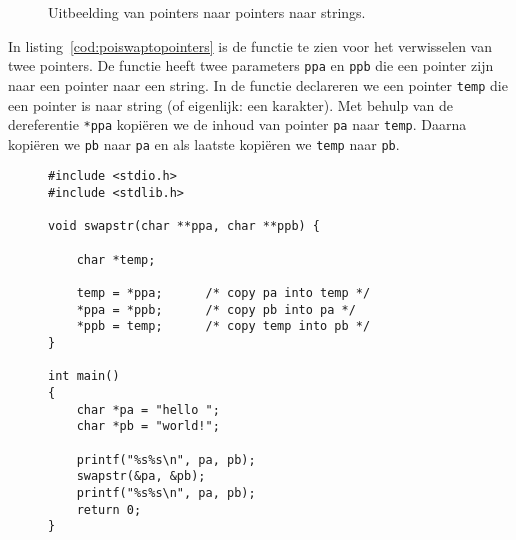 \begin{figure}[!ht]
\centering
{}
\caption{Uitbeelding van pointers naar pointers naar strings.}
\label{fig:poipointertopointerstring}
\end{figure}

In listing~\ref{cod:poiswaptopointers} is de functie te zien voor het verwisselen van twee pointers. De functie heeft twee parameters \texttt{ppa} en \texttt{ppb} die een pointer zijn naar een pointer naar een string. In de functie declareren we een pointer \texttt{temp} die een pointer is naar string (of eigenlijk: een karakter). Met behulp van de dereferentie \texttt{*ppa} kopiëren we de inhoud van pointer \texttt{pa} naar \texttt{temp}. Daarna kopiëren we \texttt{pb} naar \texttt{pa} en als laatste kopiëren we \texttt{temp} naar \texttt{pb}.

\begin{figure}[!ht]
\begin{lstlisting}[caption=Functie voor het verwisselen van twee pointers.,label=cod:poiswaptopointers]
#include <stdio.h>
#include <stdlib.h>

void swapstr(char **ppa, char **ppb) {

	char *temp;

    temp = *ppa;      /* copy pa into temp */
    *ppa = *ppb;      /* copy pb into pa */
    *ppb = temp;      /* copy temp into pb */
}

int main()
{
    char *pa = "hello ";
    char *pb = "world!";

    printf("%s%s\n", pa, pb);
    swapstr(&pa, &pb);
    printf("%s%s\n", pa, pb);
    return 0;
}
\end{lstlisting}
\end{figure}

